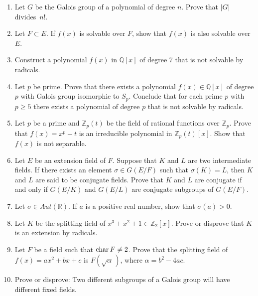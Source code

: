 {\begin{enumerate}
 
\item
Let $G$ be the Galois group of a polynomial of degree $n$.  Prove
that $|G|$ divides~$n!$.
 
 
\item
Let $F \subset E$.  If $f(x)$ is solvable over $F$, show that $f(x)$
is also solvable over $E$.
 
 
\item
Construct a polynomial $f(x)$ in ${\mathbb Q}[x]$ of degree 7 that is not
solvable by \linebreak radicals.
 
 
\item
Let $p$ be prime.  Prove that there exists a polynomial $f(x) \in
{\mathbb Q}[x]$ of degree $p$ with Galois group isomorphic to $S_p$.
Conclude that for each prime $p$ with $p \geq 5$ there exists a
polynomial of degree $p$ that is not solvable by radicals. 
 
 
\item
Let $p$ be a prime and ${\mathbb Z}_p(t)$ be the field of rational
functions over ${\mathbb Z}_p$.  Prove that $f(x) = x^p - t$ is an
irreducible polynomial in ${\mathbb Z}_p(t)[x]$.  Show that $f(x)$ is not
separable. 
 
 
\item
Let $E$ be an extension field of $F$. Suppose that $K$ and $L$ are two 
intermediate fields.  If there exists an element $\sigma \in G(E/F)$
such that $\sigma(K) = L$, then $K$ and $L$ are said to be {\bfi
conjugate fields}.
Prove that $K$ and $L$ are conjugate if and only if $G(E/K)$ and
$G(E/L)$ are conjugate subgroups of $G(E/F)$. 
 
 
\item 
Let $\sigma \in Aut( {\mathbb R} )$.  If $a$ is a positive real
number, show that $\sigma( a) > 0$.
 
 
\item 
Let $K$ be the splitting field of $x^3 + x^2 + 1 \in {\mathbb Z}_2[x]$.
Prove or disprove that $K$ is an extension by radicals.
 
\item
Let $F$ be a field such that ${\rm char}\, F \neq 2$. Prove that the
splitting field of $f(x) = a x^2 + b x + c$ is $F( \sqrt{\alpha}\, )$,
where $\alpha = b^2 - 4ac$. 
 
 
\item
Prove or disprove: Two different subgroups of a Galois group will
have different fixed fields.
 
 
 

\end{enumerate}}
